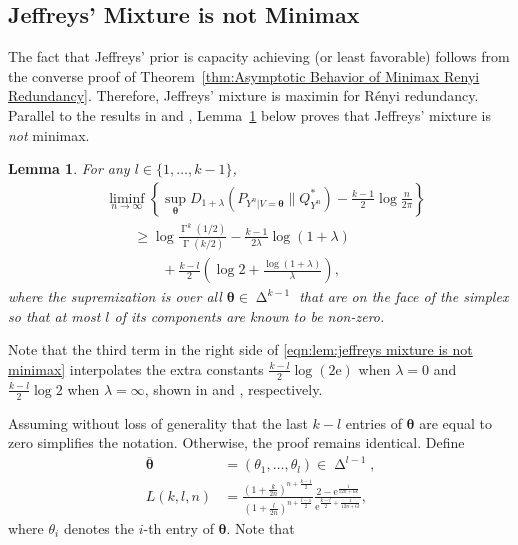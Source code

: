 \documentclass[journal, 10pt]{IEEEtran}
\newcommand{\rme}{\mathrm{e}}
\theoremstyle{plain}
\theoremstyle{plain}
\newtheorem{lem}{Lemma}%
\theoremstyle{plain}
\theoremstyle{plain}
\newcommand{\boldtheta}{\mathbold{\theta}}
\newcommand{\opGamma}{\operatorname{\Gamma}}
\newcommand{\simplex}{\operatorname{\Delta}}
\begin{document}
\begin{appendices}
\section{Jeffreys' Mixture is not Minimax}\label{appdx:jeffreys' mixture is not minimax}
The fact that Jeffreys' prior is capacity achieving (or least favorable) follows from the converse proof of Theorem~\ref{thm:Asymptotic Behavior of Minimax Renyi Redundancy}. Therefore, Jeffreys' mixture is maximin for R\'enyi redundancy. Parallel to the results in \cite{XieBarron1997} and \cite{XieBarron2000}, Lemma~\ref{lem:jefreys mixture is not minimax} below proves that Jeffreys' mixture is \emph{not} minimax. 
\begin{lem} \label{lem:jefreys mixture is not minimax}
For any $l \in \{1,\hdots, k-1 \}$, 
\begin{align}
&\liminf_{n\to \infty }\left\{  \sup_{\boldtheta} D_{1+\lambda}(P_{Y^n|V=\boldtheta} \| Q_{Y^n}^\ast ) - \frac{k-1}{2} \log \frac{n}{2\pi} \right\} \nonumber \\ 
&\qquad  \ge \log \frac{\opGamma^k(1/2) }{\opGamma(k/2) }-\frac{k-1}{2\lambda} \log(1+\lambda) \label{eqn:lem:jeffreys mixture is not minimax} \\ 
&\qquad \qquad
+\frac{k-l}{2} \left( \log 2 + \frac{\log (1+\lambda) }{\lambda } \right)\text{,} \nonumber
\end{align}
where the supremization is over all $\boldtheta\in \simplex^{k-1}$ that are on the face of the simplex so that at most $l $ of its components are known to be non-zero. 
\end{lem}
Note that the third term in the right side of \eqref{eqn:lem:jeffreys mixture is not minimax} interpolates the extra constants $\frac{k-l}{2} \log(2\rme)  $ when $\lambda=0$  and $\frac{k-l}{2} \log2  $ when $\lambda=\infty $, shown in \cite{XieBarron1997} and \cite{XieBarron2000}, respectively.
\begin{IEEEproof}
		Assuming without loss of generality that the last $k-l$ entries of $\boldtheta $ are equal to zero simplifies the notation. Otherwise, the proof remains identical. Define
		\begin{align}
			\bar{\boldtheta}&=(\theta_1, \hdots, \theta_l ) \in \simplex^{l-1} \text{,}\\
		L(k,l,n)	&= \frac{\left( 1+\frac{k}{2n} \right)^{n+\frac{k-1}{2} } }{\left( 1+ \frac{l}{2n} \right)^{n+\frac{l-1}{2} } }\frac{2-\rme^{\frac{1}{12n+6k} } }{\rme^{\frac{k-l}{2}+\frac{1}{12n+6l} } }\text{,}
		\end{align}
where $\theta_i$ denotes the $i$-th entry of $\boldtheta$. Note that

\end{IEEEproof}
\end{appendices}
\end{document}
